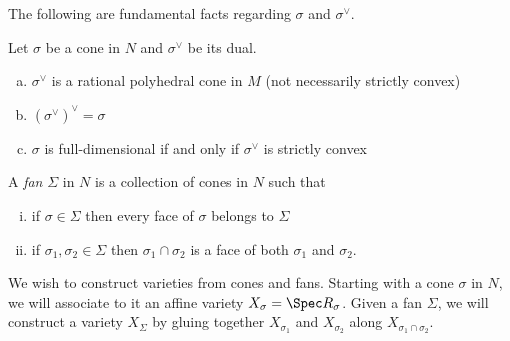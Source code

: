 The following are fundamental facts regarding $\sigma$ and $\sigma^{\vee}$.
\begin{prop}\label{prop:facts-about-cones-and-duals}
	Let $\sigma$ be a cone in $N$ and $\sigma^{\vee}$ be its dual.
	\begin{enumerate}[(a)]
		\item $\sigma^{\vee}$ is a rational polyhedral cone in $M$ (not necessarily strictly convex)
		\item $(\sigma^{\vee})^{\vee} = \sigma$
		\item $\sigma$ is full-dimensional if and only if $\sigma^{\vee}$ is strictly convex
	\end{enumerate}
\end{prop}
\begin{defn}\label{defn:fan}
	A \emph{fan} $\Sigma$ in $N$ is a collection of cones in $N$ such that
	\begin{enumerate}[(i)]
		\item if $\sigma \in \Sigma$ then every face of $\sigma$ belongs to $\Sigma$ 
		\item if $\sigma_1,\sigma_2\in \Sigma$ then $\sigma_1\cap \sigma_2$ is a face of both $\sigma_1$ and $\sigma_2$.
	\end{enumerate}
\end{defn}
We wish to construct varieties from cones and fans. Starting with a cone $\sigma$ in $N$, we will associate to it an affine variety $X_\sigma = \Spec R_\sigma$. Given a fan $\Sigma$, we will construct a variety $X_\Sigma$ by gluing together $X_{\sigma_1}$ and $X_{\sigma_2}$ along $X_{\sigma_1 \cap \sigma_2}$.

